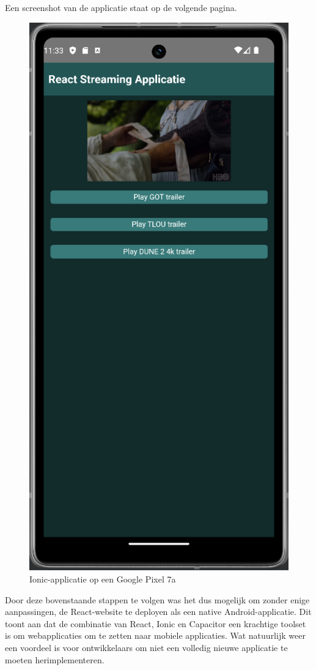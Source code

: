 Een screenshot van de applicatie staat op de volgende pagina.

\begin{figure}
  \centering
  \includegraphics[width=0.7\linewidth]{img/ReactIonicPhone}
  \caption{Ionic-applicatie op een Google Pixel 7a}
  \label{fig:Ionic-applicatie op een Google Pixel 7a}
\end{figure}

Door deze bovenstaande stappen te volgen was het dus mogelijk om zonder enige aanpassingen, de React-website te deployen als een native Android-applicatie. Dit toont aan dat de combinatie van React, Ionic en Capacitor een krachtige toolset is om webapplicaties om te zetten naar mobiele applicaties. Wat natuurlijk weer een voordeel is voor ontwikkelaars om niet een volledig nieuwe applicatie te moeten herimplementeren.

